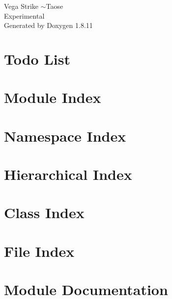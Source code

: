 \documentclass[twoside]{book}
\newcommand{\+}{\discretionary{\mbox{\scriptsize$\hookleftarrow$}}{}{}}
\newcommand{\clearemptydoublepage}{%
  \newpage{\pagestyle{empty}\cleardoublepage}%
}
\begin{document}
\hypersetup{pageanchor=false,
             bookmarksnumbered=true,
             pdfencoding=unicode
            }
\begin{titlepage}
\vspace*{7cm}
\begin{center}%
{\Large Vega Strike $\sim$\+Taose \\[1ex]\large Experimental }\\
\vspace*{1cm}
{\large Generated by Doxygen 1.8.11}\\
\end{center}
\end{titlepage}
\clearemptydoublepage
\tableofcontents
\clearemptydoublepage
{}
\hypersetup{pageanchor=true}

\chapter{Todo List}
\label{todo}
\hypertarget{todo}{}

\chapter{Module Index}

\chapter{Namespace Index}

\chapter{Hierarchical Index}

\chapter{Class Index}

\chapter{File Index}

\chapter{Module Documentation}











\end{document}
